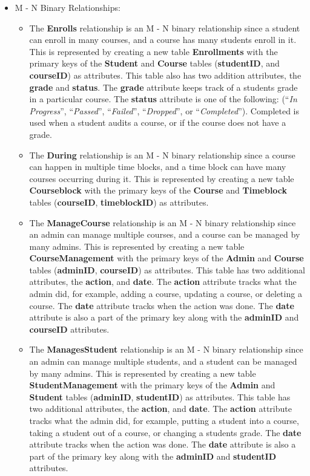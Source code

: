 \documentclass{report}
\begin{document}
\begin{itemize}
    \item M - N Binary Relationships:
    \begin{itemize}
        \item The \textbf{Enrolls} relationship is an M - N binary relationship since a student can enroll in many courses, and a course has many students enroll in it. This is represented by creating a new table \textbf{Enrollments} with the primary keys of the \textbf{Student} and \textbf{Course} tables (\textbf{studentID}, and \textbf{courseID}) as attributes. This table also has two addition attributes, the \textbf{grade} and \textbf{status}. The \textbf{grade} attribute keeps track of a students grade in a particular course. The \textbf{status} attribute is one of the following: (``\textit{In Progress}'', ``\textit{Passed}'', ``\textit{Failed}'', ``\textit{Dropped}'', or ``\textit{Completed}''). Completed is used when a student audits a course, or if the course does not have a grade.
        \item The \textbf{During} relationship is an M - N binary relationship since a course can happen in multiple time blocks, and a time block can have many courses occurring during it. This is represented by creating a new table \textbf{Courseblock} with the primary keys of the \textbf{Course} and \textbf{Timeblock} tables (\textbf{courseID}, \textbf{timeblockID}) as attributes.
        \item The \textbf{ManageCourse} relationship is an M - N binary relationship since an admin can manage multiple courses, and a course can be managed by many admins. This is represented by creating a new table \textbf{CourseManagement} with the primary keys of the \textbf{Admin} and \textbf{Course} tables (\textbf{adminID}, \textbf{courseID}) as attributes. This table has two additional attributes, the \textbf{action}, and \textbf{date}. The \textbf{action} attribute tracks what the admin did, for example, adding a course, updating a course, or deleting a course. The \textbf{date} attribute tracks when the action was done. The \textbf{date} attribute is also a part of the primary key along with the \textbf{adminID} and \textbf{courseID} attributes.
        \item The \textbf{ManagesStudent} relationship is an M - N binary relationship since an admin can manage multiple students, and a student can be managed by many admins. This is represented by creating a new table \textbf{StudentManagement} with the primary keys of the \textbf{Admin} and \textbf{Student} tables (\textbf{adminID}, \textbf{studentID}) as attributes. This table has two additional attributes, the \textbf{action}, and \textbf{date}. The \textbf{action} attribute tracks what the admin did, for example, putting a student into a course, taking a student out of a course, or changing a students grade. The \textbf{date} attribute tracks when the action was done. The \textbf{date} attribute is also a part of the primary key along with the \textbf{adminID} and \textbf{studentID} attributes.
    \end{itemize}

\end{itemize}
\end{document}

